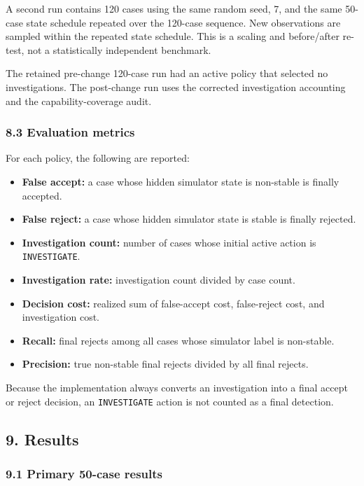 \documentclass[
]{article}
\providecommand{\tightlist}{%
  \setlength{\itemsep}{0pt}\setlength{\parskip}{0pt}}
\begin{document}
A second run contains 120 cases using the same random seed, 7, and the
same 50-case state schedule repeated over the 120-case sequence. New
observations are sampled within the repeated state schedule. This is a
scaling and before/after re-test, not a statistically independent
benchmark.

The retained pre-change 120-case run had an active policy that selected
no investigations. The post-change run uses the corrected investigation
accounting and the capability-coverage audit.

\subsubsection{8.3 Evaluation metrics}\label{evaluation-metrics}

For each policy, the following are reported:

\begin{itemize}
\tightlist
\item
  \textbf{False accept:} a case whose hidden simulator state is
  non-stable is finally accepted.
\item
  \textbf{False reject:} a case whose hidden simulator state is stable
  is finally rejected.
\item
  \textbf{Investigation count:} number of cases whose initial active
  action is \texttt{INVESTIGATE}.
\item
  \textbf{Investigation rate:} investigation count divided by case
  count.
\item
  \textbf{Decision cost:} realized sum of false-accept cost,
  false-reject cost, and investigation cost.
\item
  \textbf{Recall:} final rejects among all cases whose simulator label
  is non-stable.
\item
  \textbf{Precision:} true non-stable final rejects divided by all final
  rejects.
\end{itemize}

Because the implementation always converts an investigation into a final
accept or reject decision, an \texttt{INVESTIGATE} action is not counted
as a final detection.

\subsection{9. Results}\label{results}

\subsubsection{9.1 Primary 50-case
results}\label{primary-50-case-results}
\end{document}
